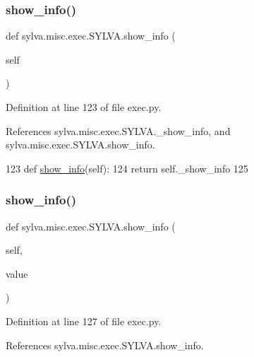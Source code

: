 \subsubsection{\texorpdfstring{show\+\_\+info()}{show\_info()}\hspace{0.1cm}{\footnotesize\ttfamily [1/2]}}
{\footnotesize\ttfamily def sylva.\+misc.\+exec.\+S\+Y\+L\+V\+A.\+show\+\_\+info (\begin{DoxyParamCaption}\item[{}]{self }\end{DoxyParamCaption})}



Definition at line 123 of file exec.\+py.



References sylva.\+misc.\+exec.\+S\+Y\+L\+V\+A.\+\_\+show\+\_\+info, and sylva.\+misc.\+exec.\+S\+Y\+L\+V\+A.\+show\+\_\+info.


\begin{DoxyCode}
123   \textcolor{keyword}{def }\hyperlink{namespacesylva_1_1misc_1_1exec_a887473109a0bd4665bac834e1a34eec0}{show\_info}(self):
124     \textcolor{keywordflow}{return} self.\_show\_info
125 
\end{DoxyCode}
\mbox{\label{classsylva_1_1misc_1_1exec_1_1_s_y_l_v_a_aa804346f551306b51131cb68194e8c71}} 
\subsubsection{\texorpdfstring{show\+\_\+info()}{show\_info()}\hspace{0.1cm}{\footnotesize\ttfamily [2/2]}}
{\footnotesize\ttfamily def sylva.\+misc.\+exec.\+S\+Y\+L\+V\+A.\+show\+\_\+info (\begin{DoxyParamCaption}\item[{}]{self,  }\item[{}]{value }\end{DoxyParamCaption})}



Definition at line 127 of file exec.\+py.



References sylva.\+misc.\+exec.\+S\+Y\+L\+V\+A.\+show\+\_\+info.


